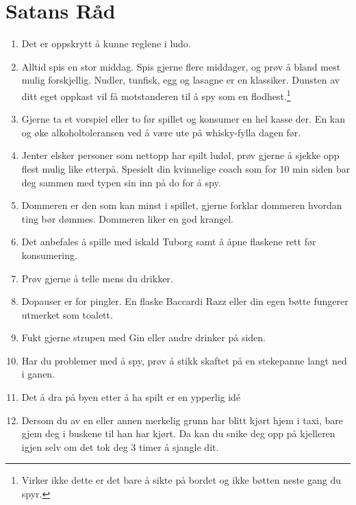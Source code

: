 \documentclass[10pt,a4paper,norsk,openany]{book}
\begin{document}
\section{Satans Råd}

\begin{enumerate}
	\item Det er oppskrytt å kunne reglene i ludo.
    
	\item Alltid spis en stor middag. Spis gjerne flere middager, og prøv å bland
    mest mulig forskjellig. Nudler, tunfisk, egg og lasagne er en klassiker. Dunsten av
    ditt eget oppkast vil få motstanderen til å spy som en
    flodhest.$\!$\footnote{Virker ikke dette er det bare å sikte på bordet og ikke
    bøtten neste gang du spyr.}
    
  \item Gjerne ta et vorspiel eller to før spillet og konsumer en hel kasse
    der. En kan og øke alkoholtoleransen ved å være ute på whisky-fylla dagen før.
    
  \item Jenter elsker personer som nettopp har spilt ludøl, prøv gjerne å
    sjekke opp flest mulig like etterpå. Spesielt din kvinnelige coach som
    for 10 min siden bar deg sammen med typen sin inn på do for å spy.

  \item Dommeren er den som kan minst i spillet, gjerne forklar dommeren
    hvordan ting bør dømmes. Dommeren liker en god krangel.
    
  \item Det anbefales å spille med iskald Tuborg samt å åpne flaskene rett før
    konsumering.
    
  \item Prøv gjerne å telle mens du drikker. 
    
  \item Dopauser er for pingler. En flaske Baccardi Razz eller din egen bøtte
    fungerer utmerket som toalett.
    
  \item Fukt gjerne strupen med Gin eller andre drinker på siden.
    
  \item Har du problemer med å spy, prøv å stikk skaftet på en stekepanne langt ned i ganen.

  \item Det å dra på byen etter å ha spilt er en ypperlig idé

  \item Dersom du av en eller annen merkelig grunn har blitt kjørt hjem i taxi,
    bare gjem deg i buskene til han har kjørt. Da kan du snike deg opp på
    kjelleren igjen selv om det tok deg 3 timer å sjangle dit.
\end{enumerate}
\end{document}
